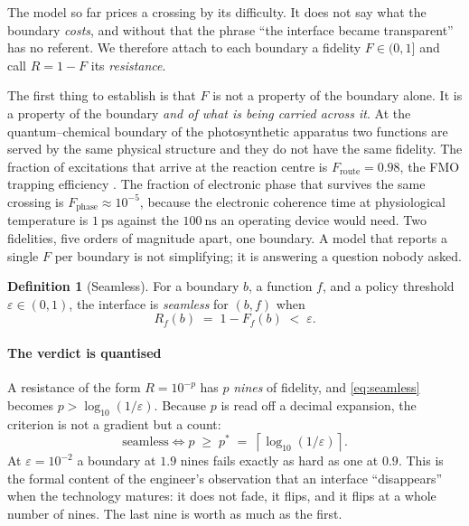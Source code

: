\documentclass[conference]{IEEEtran}
\theoremstyle{definition}
\newtheorem{definition}{Definition}
\begin{document}
The model so far prices a crossing by its difficulty. It does not say what the
boundary \emph{costs}, and without that the phrase ``the interface became
transparent'' has no referent. We therefore attach to each boundary a fidelity
$F\in(0,1]$ and call $R=1-F$ its \emph{resistance}.

The first thing to establish is that $F$ is not a property of the boundary alone.
It is a property of the boundary \emph{and of what is being carried across it}. At
the quantum--chemical boundary of the photosynthetic apparatus two functions are
served by the same physical structure and they do not have the same fidelity. The
fraction of excitations that arrive at the reaction centre is
$F_{\text{route}}=0.98$, the FMO trapping efficiency \cite{engel2007}. The
fraction of electronic phase that survives the same crossing is
$F_{\text{phase}}\approx 10^{-5}$, because the electronic coherence time at
physiological temperature is $\SI{1}{\pico\second}$ \cite{duan2017} against the
$\SI{100}{\nano\second}$ an operating device would need. Two fidelities, five
orders of magnitude apart, one boundary. A model that reports a single $F$ per
boundary is not simplifying; it is answering a question nobody asked.

\begin{definition}[Seamless]
For a boundary $b$, a function $f$, and a policy threshold $\varepsilon\in(0,1)$,
the interface is \emph{seamless} for $(b,f)$ when
\begin{equation}
R_f(b) \;=\; 1-F_f(b) \;<\; \varepsilon .
\label{eq:seamless}
\end{equation}
\end{definition}

\paragraph{The verdict is quantised} A resistance of the form $R=10^{-p}$ has $p$
\emph{nines} of fidelity, and \eqref{eq:seamless} becomes $p>\log_{10}(1/\varepsilon)$.
Because $p$ is read off a decimal expansion, the criterion is not a gradient but a
count:
\begin{equation}
\text{seamless}\iff p \;\ge\; p^{*}\;=\;\left\lceil \log_{10}(1/\varepsilon)\right\rceil .
\label{eq:nines}
\end{equation}
At $\varepsilon=10^{-2}$ a boundary at $1.9$ nines fails exactly as hard as one at
$0.9$. This is the formal content of the engineer's observation that an interface
``disappears'' when the technology matures: it does not fade, it flips, and it
flips at a whole number of nines. The last nine is worth as much as the first.
\end{document}

